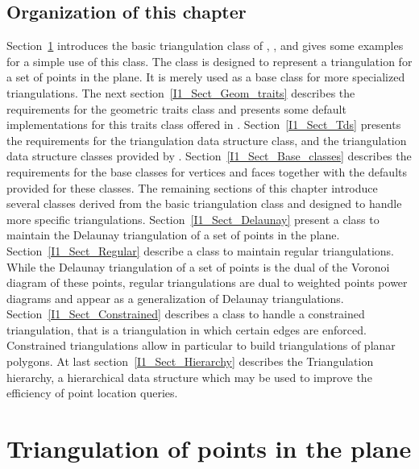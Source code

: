 \subsection*{Organization of this chapter}
Section~\ref{I1_Sect_Triangulation_2} introduces the basic triangulation class of \cgal ,
 ,  and gives some examples for a simple use of this class.
 The  class  is designed to represent 
a triangulation for a set of points in the plane. It is merely used
as a base class for more specialized triangulations.
The next section~\ref{I1_Sect_Geom_traits}
describes the requirements for the geometric
traits class and presents some default implementations
for this traits class offered in \cgal. 
Section~\ref{I1_Sect_Tds}  presents the requirements for the 
{triangulation data structure} class,
 and the {triangulation data structure} classes
provided by \cgal. 
Section~\ref{I1_Sect_Base_classes} describes the requirements
for the base classes for vertices and faces
together with the defaults provided for these classes.
The remaining sections of this chapter introduce
several classes derived from the basic triangulation class
and designed to handle more specific triangulations.
Section~\ref{I1_Sect_Delaunay} present a class to 
maintain the Delaunay triangulation of a set of points in the plane.
 Section~\ref{I1_Sect_Regular}
describe a class to maintain regular triangulations.
While the Delaunay triangulation of a set of points
is the dual of the Voronoi
diagram of these points,
 regular triangulations are dual to weighted points power diagrams
and  appear as a generalization of
Delaunay triangulations. Section~\ref{I1_Sect_Constrained} 
describes a class to handle a constrained triangulation,
that is a triangulation in which certain edges are enforced.
Constrained triangulations allow in particular to build  
triangulations of planar polygons.
At last section~\ref{I1_Sect_Hierarchy} describes the
Triangulation hierarchy, a hierarchical data
structure which may be used to improve the efficiency
of point location queries.

 

\section{Triangulation of points in the plane }
\label{I1_Sect_Triangulation_2}

